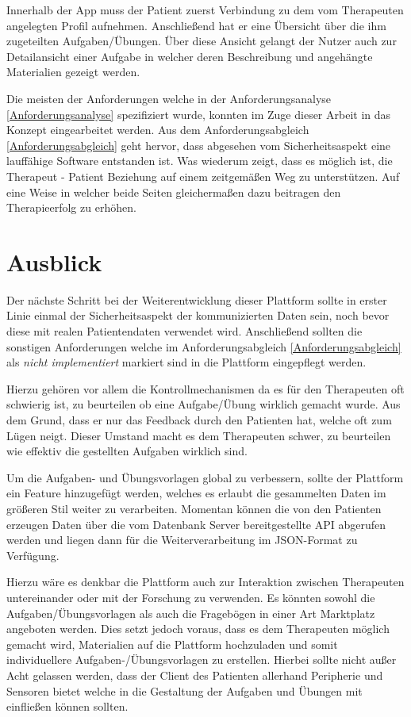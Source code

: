 Innerhalb der App muss der Patient zuerst Verbindung zu dem vom Therapeuten angelegten Profil aufnehmen. Anschließend hat er eine Übersicht über die ihm zugeteilten Aufgaben/Übungen. Über diese Ansicht gelangt der Nutzer auch zur Detailansicht einer Aufgabe in welcher deren Beschreibung und angehängte Materialien gezeigt werden.

Die meisten der Anforderungen welche in der Anforderungsanalyse \ref{Anforderungsanalyse} spezifiziert wurde, konnten im Zuge dieser Arbeit in das Konzept eingearbeitet werden. Aus dem Anforderungsabgleich \ref{Anforderungsabgleich} geht hervor, dass abgesehen vom Sicherheitsaspekt eine lauffähige Software entstanden ist. Was wiederum zeigt, dass es möglich ist, die Therapeut - Patient Beziehung auf einem zeitgemäßen Weg zu unterstützen. Auf eine Weise in welcher beide Seiten gleichermaßen dazu beitragen den Therapieerfolg zu erhöhen.  

\section{Ausblick}
Der nächste Schritt bei der Weiterentwicklung dieser Plattform sollte in erster Linie einmal der Sicherheitsaspekt der kommunizierten Daten sein, noch bevor diese mit realen Patientendaten verwendet wird. Anschließend sollten die sonstigen Anforderungen welche im Anforderungsabgleich \ref{Anforderungsabgleich} als \textit{nicht implementiert} markiert sind in die Plattform eingepflegt werden.

Hierzu gehören vor allem die Kontrollmechanismen da es für den Therapeuten oft schwierig ist, zu beurteilen ob eine Aufgabe/Übung wirklich gemacht wurde. Aus dem Grund, dass er nur das Feedback durch den Patienten hat, welche oft zum Lügen neigt. Dieser Umstand macht es dem Therapeuten schwer, zu beurteilen wie effektiv die gestellten Aufgaben wirklich sind. 

Um die Aufgaben- und Übungsvorlagen global zu verbessern, sollte der Plattform ein Feature hinzugefügt werden, welches es erlaubt die gesammelten Daten im größeren Stil weiter zu verarbeiten. Momentan können die von den Patienten erzeugen Daten über die vom Datenbank Server bereitgestellte API abgerufen werden und liegen dann für die Weiterverarbeitung im JSON-Format zu Verfügung.

Hierzu wäre es denkbar die Plattform auch zur Interaktion zwischen Therapeuten untereinander oder mit der Forschung zu verwenden. Es könnten sowohl die Aufgaben/Übungsvorlagen als auch die Fragebögen in einer Art Marktplatz angeboten werden. Dies setzt jedoch voraus, dass es dem Therapeuten möglich gemacht wird, Materialien auf die Plattform hochzuladen und somit individuellere Aufgaben-/Übungsvorlagen zu erstellen. Hierbei sollte nicht außer Acht gelassen werden, dass der Client des Patienten allerhand Peripherie und Sensoren bietet welche in die Gestaltung der Aufgaben und Übungen mit einfließen können sollten.  

